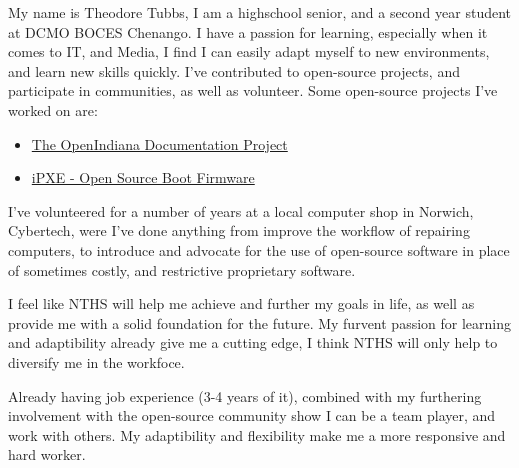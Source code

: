 \documentclass[11pt, a4paper]{awesome-cv} %
\begin{document}
\makecvheader %

\makelettertitle %


\begin{cvletter}


My name is Theodore Tubbs, I am a highschool senior, and a second year student
at DCMO BOCES Chenango. I have a passion for learning, especially when it comes
to IT, and Media, I find I can easily adapt myself to new environments, and
learn new skills quickly. I've contributed to open-source projects, and
participate in  communities, as well as volunteer. Some open-source
projects I've worked on are:

	\begin{itemize}
		\item {\href{https://github.com/OpenIndiana/oi-docs}{The OpenIndiana Documentation Project}}
		\item {\href{http://ipxe.org/}{iPXE - Open Source Boot Firmware}}
	\end{itemize}

I've volunteered for a number of years at a local computer shop in Norwich,
Cybertech, were I've done anything from improve the workflow of repairing
computers, to introduce and advocate for the use of open-source software in
place of sometimes costly, and restrictive proprietary software.


I feel like NTHS will help me achieve and further my goals in life, as well as
provide me with a solid foundation for the future. My furvent passion for
learning and adaptibility already give me a cutting edge, I think NTHS will
only help to diversify me in the workfoce.


Already having job experience (3-4 years of it), combined with my furthering
involvement with the open-source community show I can be a team player, and
work with others. My adaptibility and flexibility make me a more responsive
and hard worker.


\end{cvletter}


\makeletterclosing %
\end{document}
